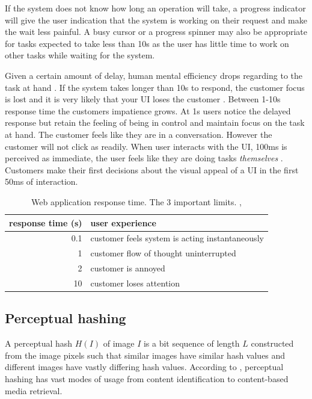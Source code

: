 \documentclass[english,12pt,a4paper,pdftex,elec,utf8]{aaltothesis}
\begin{document}
If the system does not know how long an operation will take, a progress indicator will give the user indication that the system is working on their request and make the wait less painful. A busy cursor or a progress spinner may also be appropriate for tasks expected to take less than 10s as the user has little time to work on other tasks while waiting for the system. \cite{Nielsen1993a}

Given a certain amount of delay, human mental efficiency drops regarding to the task at hand \cite{Miller1968}. If the system takes longer than 10s to respond, the customer focus is lost and it is very likely that your UI loses the customer \cite{Nielsen1993a}. Between 1-10s response time the customers impatience grows. At 1s users notice the delayed response but retain the feeling of being in control and maintain focus on the task at hand. The customer feels like they are in a conversation. However the customer will not click as readily. When user interacts with the UI, 100ms is perceived as immediate, the user feels like they are doing tasks \emph{themselves} \cite{Nielsen2010}. Customers make their first decisions about the visual appeal of a UI in the first 50ms of interaction. \cite{Nielsen2010}

\def\arraystretch{1.5}
\begin{table}[htb]
\caption{Web application response time. The 3 important limits. \cite{Miller1968},\cite{Nielsen1993}}
\label{webresponsetimes}
\begin{center}
  \begin{tabular}{rl}
    \hline
  response time (s) & user experience\\
  \hline
  0.1 & customer feels system is acting instantaneously\\
  1 & customer flow of thought uninterrupted\\
  2 & customer is annoyed\\
  10 & customer loses attention\\
  \hline
\end{tabular}
\end{center}\end{table}


\subsection{Perceptual hashing} \label{perceptualhash}
A perceptual hash $H(I)$ of image $I$ is a bit sequence of length $L$ constructed from the image pixels such that similar images have similar hash values and different images have vastly differing hash values. According to \cite{Zauner2010}, perceptual hashing has vast modes of usage from content identification to content-based media retrieval.
\end{document}
